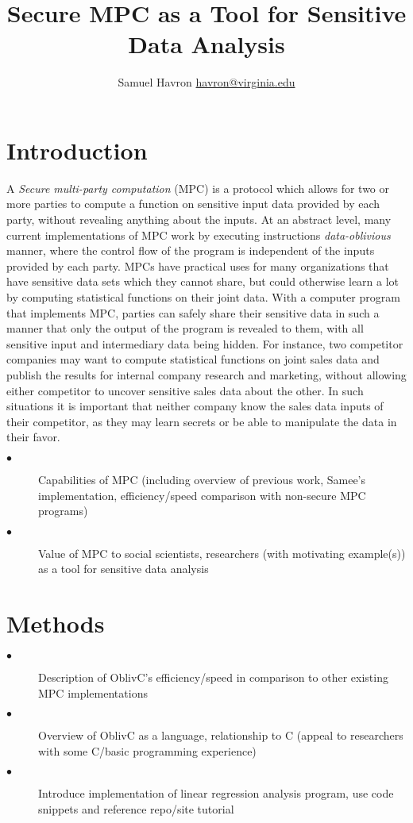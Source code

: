 \documentclass{article}
\author{Samuel Havron \textlangle{}\href{mailto:havron@virginia.edu}{havron@virginia.edu}\textrangle{}}
\title{\textbf{Secure MPC as a Tool for Sensitive Data Analysis}}
\begin{document}
\maketitle
\section{Introduction}
A \emph{Secure multi-party computation} (MPC) is a protocol which allows for two or more parties to compute a function on sensitive input data provided by each party, without revealing anything about the inputs. At an abstract level, many current implementations of MPC work by executing instructions \emph{data-oblivious} manner, where the control flow of the program is independent of the inputs provided by each party. MPCs have practical uses for many organizations that have sensitive data sets which they cannot share, but could otherwise learn a lot by computing statistical functions on their joint data. With a computer program that implements MPC, parties can safely share their sensitive data in such a manner that only the output of the program is revealed to them, with all sensitive input and intermediary data being hidden. For instance, two competitor companies may want to compute statistical functions on joint sales data and publish the results for internal company research and marketing, without allowing either competitor to uncover sensitive sales data about the other. In such situations it is important that neither company know the sales data inputs of their competitor, as they may learn secrets or be able to manipulate the data in their favor.
\\
\begin{description}
\item[$\bullet$] Capabilities of MPC (including overview of previous work, Samee's implementation, efficiency/speed comparison with non-secure MPC programs) 
\item[$\bullet$] Value of MPC to social scientists, researchers (with motivating example(s)) as a tool for sensitive data analysis
\end{description}

\section{Methods}
\begin{description}
\item[$\bullet$] Description of OblivC’s efficiency/speed in comparison to other existing MPC implementations
\item[$\bullet$] Overview of OblivC as a language, relationship to C (appeal to researchers with some C/basic programming experience) 
\item[$\bullet$] Introduce implementation of linear regression analysis program, use code snippets and reference repo/site tutorial
\end{description}
\end{document}
